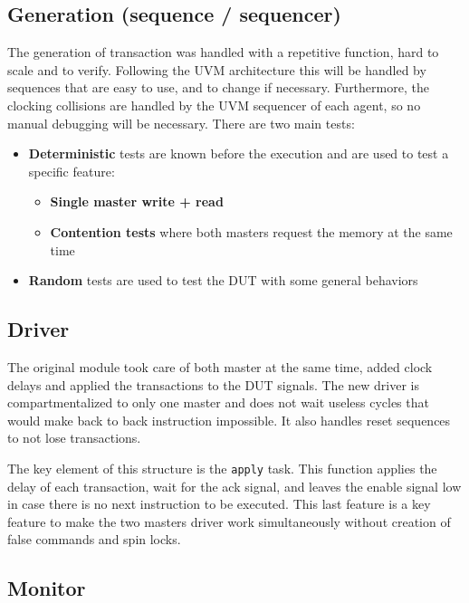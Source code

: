 \subsection*{Generation (sequence / sequencer)}

The generation of transaction was handled with a repetitive function, hard to scale and to verify.
Following the UVM architecture this will be handled by sequences that are easy to use, and to change if necessary.
Furthermore, the clocking collisions are handled by the UVM sequencer of each agent, so no manual debugging will be necessary.
There are two main tests:

\begin{itemize}
    \item \textbf{Deterministic} tests are known before the execution and are used to test a specific feature:
    \begin{itemize}
        \item \textbf{Single master write + read}
        \item \textbf{Contention tests} where both masters request the memory at the same time
    \end{itemize}
    \item \textbf{Random} tests are used to test the DUT with some general behaviors
\end{itemize}

\subsection*{Driver}

The original module took care of both master at the same time, added clock delays and applied the transactions to the DUT signals.
The new driver is compartmentalized to only one master and does not wait useless cycles that would make back to back instruction impossible.
It also handles reset sequences to not lose transactions.

The key element of this structure is the \texttt{apply} task.
This function applies the delay of each transaction, wait for the ack signal, and leaves the enable signal low in case there is no next instruction to be executed.
This last feature is a key feature to make the two masters driver work simultaneously without creation of false commands and spin locks.



\subsection*{Monitor}

